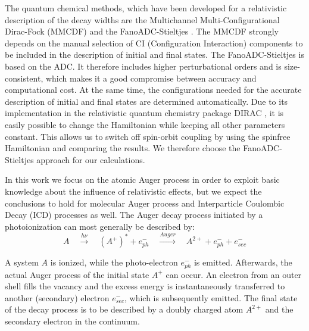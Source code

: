 The quantum chemical methods, which have been developed for a relativistic
description of the decay widths are the Multichannel Multi-Configurational
Dirac-Fock (MMCDF) \cite{Fritzsche11} and the FanoADC-Stieltjes \cite{Fasshauer15_1}.
The MMCDF strongly depends on
the manual selection of CI (Configuration
Interaction) components to be included in the description of initial and      
final states. The FanoADC-Stieltjes is based on the ADC.
It therefore includes higher perturbational
orders and is size-consistent, which makes it a good compromise between
accuracy and computational cost. At the same time, the configurations needed for the
accurate description of initial and final states are determined automatically.
Due to its implementation in the relativistic quantum chemistry package
DIRAC \cite{DIRAC17}, it is easily possible to change the Hamiltonian while
keeping all other parameters constant. This allows us to switch off
spin-orbit coupling by using the spinfree Hamiltonian and comparing the
results.
We therefore choose the FanoADC-Stieltjes approach for our calculations.


In this work we focus on the atomic Auger process     
in order                                      
to exploit basic knowledge about the influence of relativistic effects,
but we expect the conclusions to hold for molecular Auger process and
Interparticle Coulombic Decay (ICD) processes
\cite{Cederbaum97,Marburger03,Hergenhahn11,Jahnke15} as well.
The Auger decay process initiated by a photoionization
can most generally be described by:
\begin{equation*}                                               
 A \quad \xrightarrow{h\nu}\quad (A^+)^* + e^-_{ph} \quad       
    \xrightarrow{Auger} \quad A^{2+} + e^-_{ph} + e^-_{sec}     
\end{equation*}                                                 
                                                                
A system $A$ is ionized, while the photo-electron $e^-_{ph}$ is emitted.      
Afterwards, the actual Auger process of the initial state $A^+$ can occur.    
An electron from an outer                                       
shell fills the vacancy and the excess energy is instantaneously transferred  
to another (secondary) electron $e^-_{sec}$, which              
is subsequently emitted. The final state of the decay process   
is to be described by a doubly charged atom $A^{2+}$ and the secondary        
electron in the continuum.

